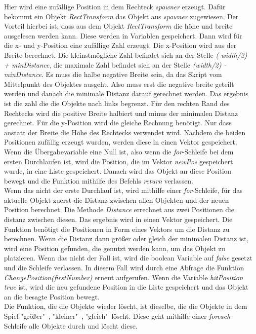 Hier wird eine zufällige Position in dem Rechteck \textit{spawner} erzeugt. Dafür bekommt ein Objekt \textit{RectTransform} das Objekt aus \textit{spawner} zugewiesen. Der Vorteil hierbei ist, dass aus dem Objekt \textit{RectTransform} die höhe und breite ausgelesen werden kann. Diese werden in Variablen gespeichert. Dann wird für die x- und y-Position eine zufällige Zahl erzeugt. Die x-Position wird aus der Breite berechnet. Die kleinstmögliche  Zahl befindet sich an der Stelle \textit{(-width/2) + minDistance}, die maximale Zahl befindet sich an der Stelle \textit{(width/2) - minDistance}. Es muss die halbe negative Breite sein, da das Skript vom Mittelpunkt des Objektes ausgeht. Also muss erst die negative breite geteilt werden und danach die minimale Distanz darauf gerechnet werden. Das ergebnis ist die zahl die die Objekte nach links begrenzt. Für den rechten Rand des Rechtecks wird die positive Breite halbiert und minus der minimalen Distanz gerechnet. Für die y-Position wird die gleiche Rechnung benötigt. Nur dass anstatt der Breite die Höhe des Rechtecks verwendet wird. Nachdem die beiden Positionen zufällig erzeugt wurden, werden diese in einen Vektor gespeichert. Wenn die Übergabevariable eine Null ist, also wenn die \textit{for}-Schleife bei dem ersten Durchlaufen ist, wird die Position, die im Vektor \textit{newPos} gespeichert wurde, in eine Liste gespeichert. Danach wird das Objekt an diese Position bewegt und die Funktion mithilfe des Befehls \textit{return} verlassen.\\
Wenn das nicht der erste Durchlauf ist, wird mithilfe einer \textit{for}-Schleife, für das aktuelle Objekt zuerst die Distanz zwischen allen Objekten und der neuen Position berechnet.
Die Methode \textit{Distance} errechnet aus zwei Positionen die distanz zwischen diesen. Das ergebnis wird in einen Vektor gespeichert. Die Funktion benötigt die Positionen in Form eines Vektors um die Distanz zu berechnen. Wenn die Distanz dann größer oder gleich der minimalen Distanz ist, wird eine Position gefunden, die genutzt werden kann, um das Objekt zu platzieren. Wenn das nicht der Fall ist, wird die boolean Variable auf \textit{false} gesetzt und die Schleife verlassen. In diesem Fall wird durch eine Abfrage die Funktion \textit{ChangePosition(firstNumber)} erneut aufgerufen. Wenn die Variable \textit{hitPosition} \textit{true} ist, wird die neu gefundene Position in die Liste gespeichert und das Objekt an die besagte Position bewegt.\\
Die Funktion, die die Objekte wieder löscht, ist dieselbe, die die Objekte in dem Spiel "größer"\ , "kleiner"\ , "gleich"\ löscht. Diese geht mithilfe einer \textit{foreach}-Schleife alle Objekte durch und löscht diese.\\

